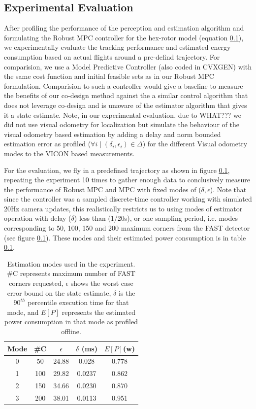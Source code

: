 \subsection{Experimental Evaluation}

After profiling the performance of the perception and estimation algorithm and formulating the Robust MPC controller for the hex-rotor model (equation \ref{}), we experimentally evaluate the tracking performance and estimated energy consumption based on actual flights around a pre-defind trajectory. For comparision, we use a Model Predictive Controller (also coded in CVXGEN) with the same cost function and initial feasible sets as in our Robust MPC formulation. Comparision to such a controller would give a baseline to measure the benefits of our co-design method against the a similar control algorithm that does not leverage co-design and is unaware of the estimator algorithm that gives it a state estimate. Note, in our experimental evaluation, due to WHAT??? we did not use visual odometry for localization but simulate the behaviour of the visual odometry based estimation by adding a delay and norm bounded estimation error as profiled ($\forall i \mid (\delta_i,\epsilon_i) \in \Delta $) for the different Visual odometry modes to the VICON based measurements. 

For the evaluation, we fly in a predefined trajectory as shown in figure \ref{}, repeating the experiment 10 times to gather enough data to conclusively measure the performance of Robust MPC and MPC with fixed modes of ($\delta,\epsilon$). Note that since the controller was a sampled discrete-time controller working with simulated 20Hz camera updates, this realistically restricts us to using modes of estimator operation with delay ($\delta$) less than (1/20s), or one sampling period, i.e. modes corresponding to 50, 100, 150 and 200 maximum corners from the FAST detector (see figure \ref{}). These modes and their estimated power consumption is in table \ref{}.

\begin{table}[h]
\begin{tabular} {|c|c|c|c|c|}
	\hline
	Mode & \#C & $\epsilon$ & $\delta$ (ms) & $E[P]$(w) \\ \hline
	0 & 50 &  24.88 & 0.028 &  0.778  \\ \hline
 	1 & 100 & 29.82 & 0.0237 &  0.862  \\ \hline
	2 & 150 & 34.66 & 0.0230 & 0.870 \\ \hline
	3 & 200 & 38.01 & 0.0113 & 0.951 \\ \hline
	\end{tabular}
	\caption{Estimation modes used in the experiment. \#C represents maximum number of FAST corners requested, $\epsilon$ shows the worst case error bound on the state estimate, $\delta$ is the $90^{th}$ percentile execution time for that mode, and $E[P]$ represents the estimated power consumption in that mode as profiled offline.}
\end{table}



